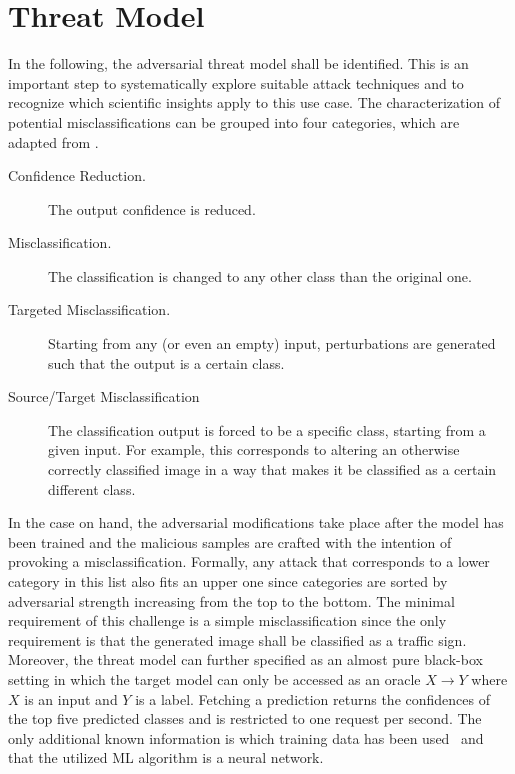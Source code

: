 
\section{Threat Model}
\label{sec:threatmodel}
In the following, the adversarial threat model shall be identified.
This is an important step to systematically explore suitable attack techniques and to recognize which scientific insights apply to this use case.
The characterization of potential misclassifications can be grouped into four categories, which are adapted from \citeauthor{papernot2016limitations}\cite{papernot2016limitations}.
\begin{description}
	\item [Confidence Reduction.] The output confidence is reduced.
	\item [Misclassification.] The classification is changed to any other class than the original one.
	\item [Targeted Misclassification.] Starting from any (or even an empty) input, perturbations are generated such that the output is a certain class.
	\item [Source/Target Misclassification] The classification output is forced to be a specific class, starting from a given input. For example, this corresponds to altering an otherwise correctly classified image in a way that makes it be classified as a certain different class.
\end{description}
In the case on hand, the adversarial modifications take place after the model has been trained and the malicious samples are crafted with the intention of provoking a misclassification.
Formally, any attack that corresponds to a lower category in this list also fits an upper one since categories are sorted by adversarial strength increasing from the top to the bottom.
The minimal requirement of this challenge is a simple misclassification since the only requirement is that the generated image shall be classified as a traffic sign.
Moreover, the threat model can further specified as an almost pure black-box setting in which the target model can only be accessed as an oracle $X \rightarrow Y$ where $X$ is an input and $Y$ is a label.
Fetching a prediction returns the confidences of the top five predicted classes and is restricted to one request per second.
The only additional known information is which training data has been used~\cite{papernot2016limitations} and that the utilized ML algorithm is a neural network.
